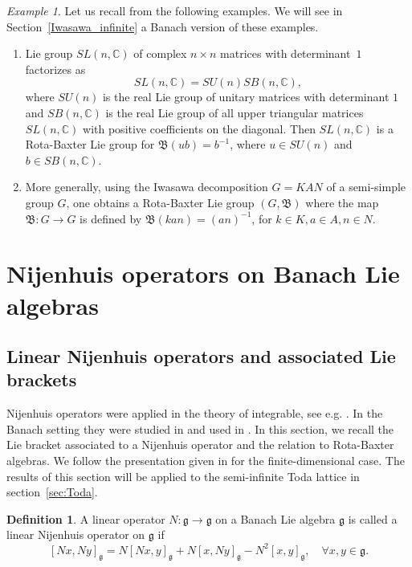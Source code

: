 \documentclass[a4paper,12pt,reqno]{amsart}%
\theoremstyle{definition}
\newtheorem{definition}[theorem]{Definition}
\theoremstyle{remark}
\newtheorem{example}[theorem]{Example}
\numberwithin{theorem}{section}
\numberwithin{equation}{section}
\newcommand{\1}{{\bf 1}}
\newcommand{\g}{{\mathfrak g}}
\newcommand\C{{\mathbb{C}}}
\begin{document}
\begin{example} Let us recall from \cite[Example 2.8]{guo2021} the following examples.  We will see in Section~\ref{Iwasawa_infinite} a Banach version of these examples. 
    \begin{enumerate}
        \item Lie group $SL(n, \C)$ of complex $n\times n$ matrices with determinant~$1$ factorizes as
        \[
        SL(n, \C) = SU(n) SB(n, \C),
        \]
        where $SU(n)$ is the real Lie group of unitary matrices with determinant $1$ and $SB(n, \C)$ is the real Lie group of all upper triangular matrices $SL(n, \C)$ with positive coefficients on the diagonal.
        Then $SL(n, \C)$ is a Rota-Baxter Lie group for $\mathfrak{B}(ub) = b^{-1}$, where $u \in SU(n)$ and $b \in SB(n, \C)$.
        \item More generally, using the Iwasawa decomposition $G = KAN$ of a semi-simple group $G$, one obtains a Rota-Baxter Lie group $(G, \mathfrak{B})$ where the map $\mathfrak{B}: G \rightarrow G$ is defined by $\mathfrak{B}(kan) = (an)^{-1}$, for $k\in K, a\in A, n\in N$.
        \end{enumerate}     
\end{example}
\section{Nijenhuis operators on Banach Lie algebras}\label{sec:N}

\subsection{Linear Nijenhuis operators and associated Lie brackets}
Nijenhuis operators were applied in the theory of integrable, see e.g. \cite{magri90,bolsinov-n1,kosmann-bial}. In the Banach setting they were studied in \cite{GLT-NN} and used in \cite{GLT-NN-proc,grabowski25}. In this section, we recall the Lie bracket associated to a Nijenhuis operator and the relation to Rota-Baxter algebras. We follow the presentation given in \cite{magri90} for the finite-dimensional case. The results of this section will be applied to the semi-infinite Toda lattice in section~\ref{sec:Toda}.


\begin{definition}
    A linear operator $N:\g \rightarrow \g$ on a Banach Lie algebra $\g$ is called a linear Nijenhuis operator on $\g$ if 
    \begin{equation}\label{N}
        [Nx, Ny]_\g = N[Nx, y]_\g + N[x, Ny]_\g - N^2[x, y]_\g, \quad \forall x, y \in \g.
    \end{equation}
\end{definition}
\end{document}
